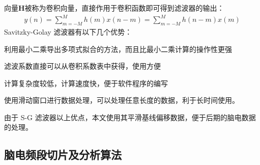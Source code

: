 \documentclass{ctexart}
\begin{document}
				向量$\bm{H}$被称为卷积向量，直接作用于卷积函数即可得到滤波器的输出：
				\begin{gather}
					y(n)=\sum_{m=-M}^{M}h(m)x(n-m)=\sum_{m=-M}^{M}h(n-m)x(m)
				\end{gather}
				Savitzky-Golay 滤波器有以下几个优势：
				\begin{compactitem}
					\item 利用最小二乘导出多项式拟合的方法，而且比最小二乘计算的操作性更强
					\item 滤波系数直接可以从卷积系数表中获得，使用方便
					\item 计算复杂度较低，计算速度快，便于软件程序的编写
					\item 使用滑动窗口进行数据处理，可以处理任意长度的数据，利于长时间使用。
				\end{compactitem}
				由于 S-G 滤波器以上优点，本文使用其平滑基线偏移数据，便于后期的脑电数据的处理。
		\subsection{脑电频段切片及分析算法}
\end{document}
